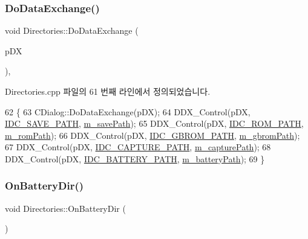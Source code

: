 \subsubsection{\texorpdfstring{Do\+Data\+Exchange()}{DoDataExchange()}}
{\footnotesize\ttfamily void Directories\+::\+Do\+Data\+Exchange (\begin{DoxyParamCaption}\item[{C\+Data\+Exchange $\ast$}]{p\+DX }\end{DoxyParamCaption})\hspace{0.3cm}{\ttfamily [protected]}, {\ttfamily [virtual]}}



Directories.\+cpp 파일의 61 번째 라인에서 정의되었습니다.


\begin{DoxyCode}
62 \{
63   CDialog::DoDataExchange(pDX);
64   DDX\_Control(pDX, \mbox{\hyperlink{resource_8h_a08017cb452df9076caf00aeef69ba583}{IDC\_SAVE\_PATH}}, \mbox{\hyperlink{class_directories_a9293c8e99ad84e8a78d127ff09534d6c}{m\_savePath}});
65   DDX\_Control(pDX, \mbox{\hyperlink{resource_8h_a13b73ee8624e7b7fbc4bfcbf0ee03bc2}{IDC\_ROM\_PATH}}, \mbox{\hyperlink{class_directories_a2d5fa2646d8216ec7f2093073174ab38}{m\_romPath}});
66   DDX\_Control(pDX, \mbox{\hyperlink{resource_8h_a75cbe88d235eb8171e8786582e10e495}{IDC\_GBROM\_PATH}}, \mbox{\hyperlink{class_directories_adffa22cb6f6be3c0b7327670dd885f83}{m\_gbromPath}});
67   DDX\_Control(pDX, \mbox{\hyperlink{resource_8h_afff0b05383dd14a104feefff5424b4b4}{IDC\_CAPTURE\_PATH}}, \mbox{\hyperlink{class_directories_a4010cf261f54e1477c6587395fd055d4}{m\_capturePath}});
68   DDX\_Control(pDX, \mbox{\hyperlink{resource_8h_aa25019c65afeea86c240d74f12b3f2e9}{IDC\_BATTERY\_PATH}}, \mbox{\hyperlink{class_directories_af8f18fc9d1fbcd0df0cba4ec6fb862de}{m\_batteryPath}});
69 \}
\end{DoxyCode}
\mbox{\label{class_directories_a31c9021298d9f3a3ea1beabe73ab7685}} 
\subsubsection{\texorpdfstring{On\+Battery\+Dir()}{OnBatteryDir()}}
{\footnotesize\ttfamily void Directories\+::\+On\+Battery\+Dir (\begin{DoxyParamCaption}{ }\end{DoxyParamCaption})\hspace{0.3cm}{\ttfamily [protected]}}



